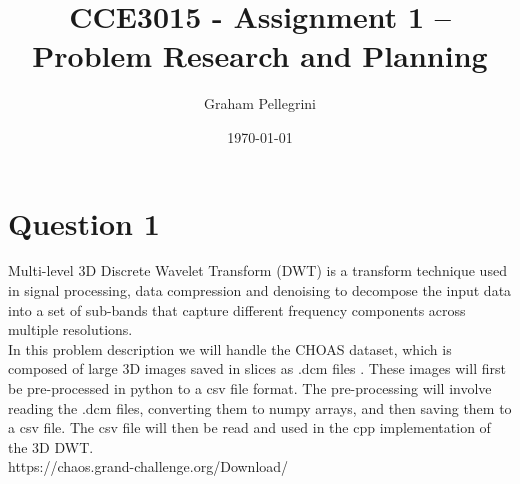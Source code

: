 \documentclass{article}
\title{CCE3015 - Assignment 1 – Problem Research and Planning}
\author{Graham Pellegrini}
\date{\today}
\begin{document}
\maketitle
\section{Question 1}
Multi-level 3D Discrete Wavelet Transform (DWT) is a transform technique used in signal processing, data compression and denoising to decompose the input data into a set of sub-bands that capture different frequency components across multiple resolutions.\\

In this problem description we will handle the CHOAS dataset, which is composed of large 3D images saved in slices as .dcm files \cite{choas}. These images will first be pre-processed in python to a csv file format. The pre-processing will involve reading the .dcm files, converting them to numpy arrays, and then saving them to a csv file. The csv file will then be read and used in the cpp implementation of the 3D DWT.\\





https://chaos.grand-challenge.org/Download/
\end{document}
